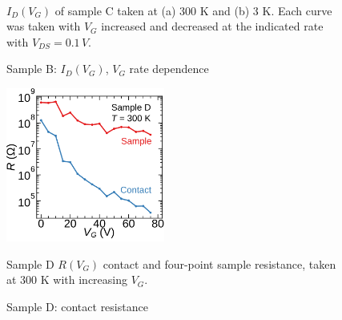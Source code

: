 \noindent 
\begin{figure}
\begin{centering}
~~
\par\end{centering}
\caption{Sample B: $I_{D}\left(V_{G}\right)$, $V_{G}$ rate dependence\label{fig:Sample-B-rate-dependance}}

$I_{D}\left(V_{G}\right)$ of sample C taken at (a) 300 K and (b)
3 K. Each curve was taken with $V_{G}$ increased and decreased at
the indicated rate with $V_{DS}=0.1\,V$.
\end{figure}

\noindent 
\begin{figure}
\begin{centering}
\includegraphics[width=5.2cm]{Chapter-In2Se3-FeSm-FET/Figures/JR190815_04/JR190815_04_RvVG_300K_contact-and-sample}
\par\end{centering}
\caption{Sample D: contact resistance\label{fig:Sample-D-contact-resistance}}

Sample D $R\left(V_{G}\right)$ contact and four-point sample resistance,
taken at 300 K with increasing $V_{G}$.
\end{figure}

